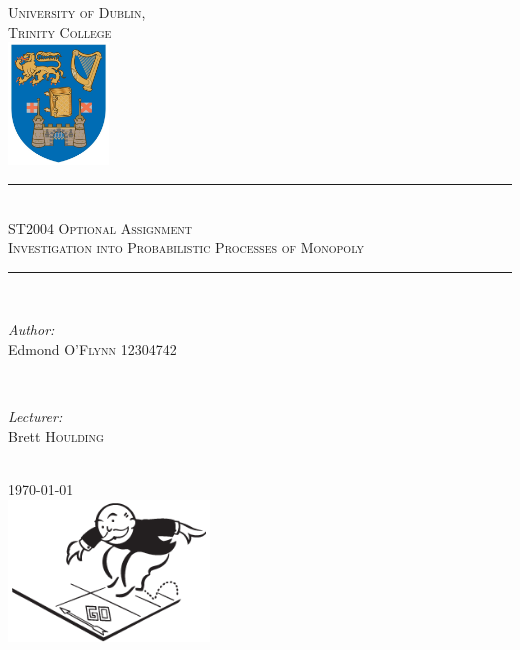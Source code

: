 \documentclass[12pt]{article}
\begin{document}
\begin{titlepage}

\newcommand{\HRule}{\rule{\linewidth}{0.5mm}}

\center
\textsc{\LARGE University of Dublin,\\Trinity College}\\[1.0cm]
\includegraphics[width=0.2\textwidth]{logo.png}

\HRule \\[0.4cm]
\textsc{\Large ST2004 Optional Assignment}\\[0.25cm]
\textsc{\large Investigation into Probabilistic Processes of Monopoly}\\[0.1cm]
\HRule \\[0.4cm]
 
\begin{minipage}{0.5\textwidth}
\begin{flushleft} \large
\emph{Author:}
\\Edmond \textsc{O'Flynn} 12304742
\end{flushleft}
\end{minipage}
~
\begin{minipage}{0.4\textwidth}
\begin{flushleft} 
\large
\emph{Lecturer:} \\
Brett \textsc{Houlding} 
\end{flushleft}
\end{minipage}\\[3cm]

{\large \today}\\[2cm] 

\includegraphics[width=0.4\textwidth]{monopoly_man.png}
\clearpage
\end{titlepage}
\end{document}
